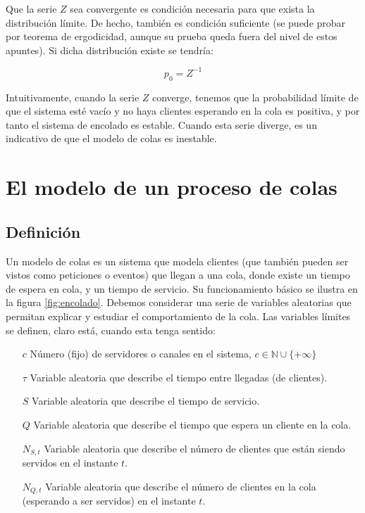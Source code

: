 \documentclass[a4paper,10pt]{scrartcl}
\theoremstyle{definition}
\numberwithin{equation}{section}
\begin{document}
Que la serie $Z$ sea convergente es condición necesaria para que exista la distribución límite. 
De hecho, también es condición suficiente (se puede probar por teorema de ergodicidad, aunque su prueba queda
fuera del nivel de estos apuntes). Si dicha distribución existe se tendría: 

\begin{equation}
 p_0 = Z^{-1} 
 \label{eq:relp0}
\end{equation}

Intuitivamente, cuando la serie $Z$ converge, tenemos que la probabilidad límite de que el 
sistema esté vacío y no haya clientes esperando en la cola es positiva, y por tanto el sistema 
de encolado es estable. Cuando esta serie diverge, es un indicativo de que el modelo de colas
es inestable.


\section{El modelo de un proceso de colas}
\subsection{Definición}
Un modelo de colas es un sistema que modela clientes (que también pueden ser vistos como peticiones o eventos) que llegan a una cola,
donde existe un tiempo de espera en cola, y un tiempo de servicio. Su funcionamiento básico se 
ilustra en la figura \ref{fig:encolado}. Debemos considerar una serie de variables aleatorias que permitan
explicar y estudiar el comportamiento de la cola. Las variables límites se definen, claro está, cuando esta 
tenga sentido:

\begin{itemize}
\item [$c$]
  Número (fijo) de servidores o canales en el sistema, $c\in \mathbb{N} \cup \{+\infty\}$
\item [$\tau$]
  Variable aleatoria que describe el tiempo entre llegadas (de clientes).
\item [$S$]
  Variable aleatoria que describe el tiempo de servicio.
\item [$Q$]
  Variable aleatoria que describe el tiempo que espera un cliente en la cola.
\item [$N_{S,t}$]
  Variable aleatoria que describe el número de clientes que están siendo servidos en el instante $t$.
\item [$N_{Q,t}$]
  Variable aleatoria que describe el número de clientes en la cola (esperando a ser servidos) en el instante $t$.
\end{itemize}
\end{document}
